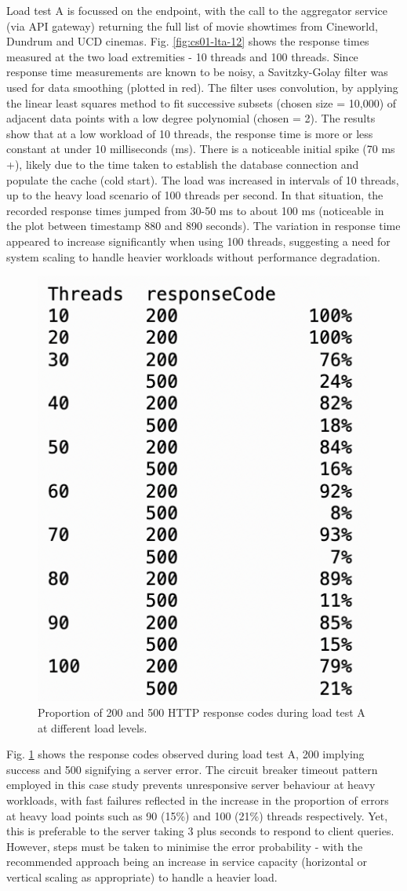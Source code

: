 Load test A is focussed on the  endpoint, with the call to the aggregator service (via API gateway) returning the full list of movie showtimes from Cineworld, Dundrum and UCD cinemas. Fig. \ref{fig:cs01-lta-12} shows the response times measured at the two load extremities - 10 threads and 100 threads. Since response time measurements are known to be noisy, a Savitzky-Golay filter was used for data smoothing (plotted in red). The filter uses convolution, by applying the linear least squares method to fit successive subsets (chosen size = 10,000) of adjacent data points with a low degree polynomial (chosen = 2). The results show that at a low workload of 10 threads, the response time is more or less constant at under 10 milliseconds (ms). There is a noticeable initial spike (70 ms +), likely due to the time taken to establish the database connection and populate the cache (cold start). The load was increased in intervals of 10 threads, up to the heavy load scenario of 100 threads per second. In that situation, the recorded response times jumped from 30-50 ms to about 100 ms (noticeable in the plot between timestamp 880 and 890 seconds). The variation in response time appeared to increase significantly when using 100 threads, suggesting a need for system scaling to handle heavier workloads without performance degradation.

\begin{figure}[H]
  \centering
  \includegraphics[width=0.35\linewidth]{./assets/images/case-study-01/cs01-lta-3.png}
  \caption{Proportion of 200 and 500 HTTP response codes during load test A at different load levels.}
  \label{fig:cs01-lta-3}
\end{figure}

Fig. \ref{fig:cs01-lta-3} shows the response codes observed during load test A, 200 implying success and 500 signifying a server error. The circuit breaker timeout pattern employed in this case study prevents unresponsive server behaviour at heavy workloads, with fast failures reflected in the increase in the proportion of errors at heavy load points such as 90 (15\%) and 100 (21\%) threads respectively. Yet, this is preferable to the server taking 3 plus seconds to respond to client queries. However, steps must be taken to minimise the error probability - with the recommended approach being an increase in service capacity (horizontal or vertical scaling as appropriate) to handle a heavier load.

